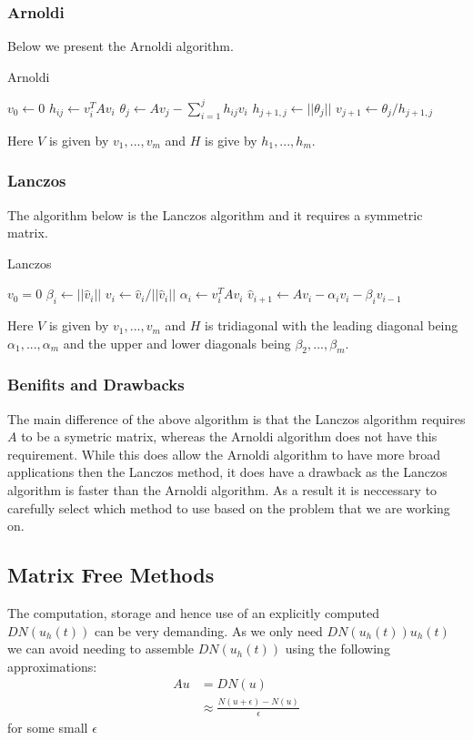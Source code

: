 \subsubsection{Arnoldi}
Below we present the Arnoldi algorithm.
\begin{algorithm}[H]
\caption{Arnoldi \cite{Fan2018}} %
\begin{algorithmic}
\State $v_0 \gets 0$
\State$h_{ij} \gets v_i^T A v_i$
\EndFor
\State$\theta_j \gets Av_j - \sum^j_{i=1} h_{ij}v_i$
\State$h_{j+1,j} \gets ||\theta_j||$
\State$v_{j+1} \gets \theta_j/h_{j+1,j}$
\EndFor
\EndProcedure
\end{algorithmic}
\end{algorithm}
Here $V$ is given by $v_1,...,v_m$ and $H$ is give by $h_1,...,h_m$.\\

\subsubsection{Lanczos}
The algorithm below is the Lanczos algorithm and it requires a symmetric matrix. \cite{Moler2003}
\begin{algorithm}[H]
\caption{Lanczos \cite{OJALVO1970}}
\begin{algorithmic}
\State $v_0 = 0$
\State$\beta_i \gets || \hat v_i ||$
\State$v_i \gets \hat v_i / || \hat v_i ||$
\State$\alpha_i \gets v_i^T A v_i$
\State$\hat v_{i+1} \gets Av_i - \alpha_iv_i - \beta_iv_{i-1}$
\EndFor
\EndProcedure
\end{algorithmic}
\end{algorithm}
Here $V$ is given by ${v_1,...,v_m}$ and $H$ is tridiagonal with the leading diagonal being $\alpha_1, ..., \alpha_m$ and the upper and lower diagonals being $\beta_2,...,\beta_m$.
\subsubsection{Benifits and Drawbacks}
The main difference of the above algorithm is that the Lanczos algorithm requires $A$ to be a symetric matrix, whereas the Arnoldi algorithm does not have this requirement.
While this does allow the Arnoldi algorithm to have more broad applications then the Lanczos method, it does have a drawback as the Lanczos algorithm is faster than the Arnoldi algorithm.
As a result it is neccessary to carefully select which method to use based on the problem that we are working on.
\subsection{Matrix Free Methods}
The computation, storage and hence use of an explicitly computed $DN(u_h(t))$ can be very demanding.
As we only need $DN(u_h(t))u_h(t)$ we can avoid needing to assemble $DN(u_h(t))$ using the following approximations:
\begin{align*}
    Au &= DN(u)\\
    &\approx \frac{N(u+\epsilon)-N(u)}{\epsilon}
\end{align*}
for some small $\epsilon$